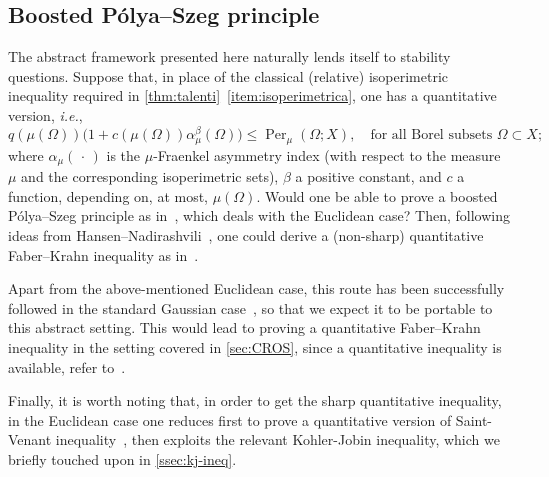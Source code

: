 \documentclass[a4paper,12pt,reqno]{amsart}
\numberwithin{equation}{section}
\renewcommand{\H}{\mathcal{H}}
\DeclareMathOperator{\Per}{Per}
\theoremstyle{plain}
\theoremstyle{definition}
\begin{document}
\subsection{Boosted \texorpdfstring{P\'olya--Szeg\H{o}}{Polya--Szego} principle}
\label{ssec:boosted}
%
The abstract framework presented here naturally lends itself to stability questions. Suppose that, in place of the classical (relative) isoperimetric inequality required in \cref{thm:talenti}~\ref{item:isoperimetrica}, one has a quantitative version, \emph{i.e.},
%
\[
q(\mu(\Omega))\bigl(1+c(\mu(\Omega)) \alpha_\mu^\beta(\Omega)\bigr) \le \Per_\mu(\Omega; X),
\quad \text{for all Borel subsets } \Omega\subset X;
\]
%
where $\alpha_\mu(\,\cdot\,)$ is the $\mu$-Fraenkel asymmetry index (with respect to the measure $\mu$ and the corresponding isoperimetric sets), $\beta$ a positive constant, and $c$ a function, depending on, at most, $\mu(\Omega)$. Would one be able to prove a boosted P\'olya--Szeg\H{o} principle as in~\cite[Lem.~7.10]{BDP17}, which deals with the Euclidean case? Then, following ideas from Hansen--Nadirashvili~\cite{HN94}, one could derive a (non-sharp) quantitative Faber--Krahn inequality as in~\cite[Thm.~7.11]{BDP17}.

Apart from the above-mentioned Euclidean case, this route has been successfully followed in the standard Gaussian case~\cite{CCLMP24}, so that we expect it to be portable to this abstract setting. This would lead to proving a quantitative Faber--Krahn inequality in the setting covered in \cref{sec:CROS}, since a quantitative inequality is available, refer to~\cite{CFPROS22}.

Finally, it is worth noting that, in order to get the sharp quantitative inequality, in the Euclidean case one reduces first to prove a quantitative version of Saint-Venant inequality~\cite[Thm.~7.20]{BDP17}, then exploits the relevant Kohler-Jobin inequality, which we briefly touched upon in \cref{ssec:kj-ineq}.




\end{document}
